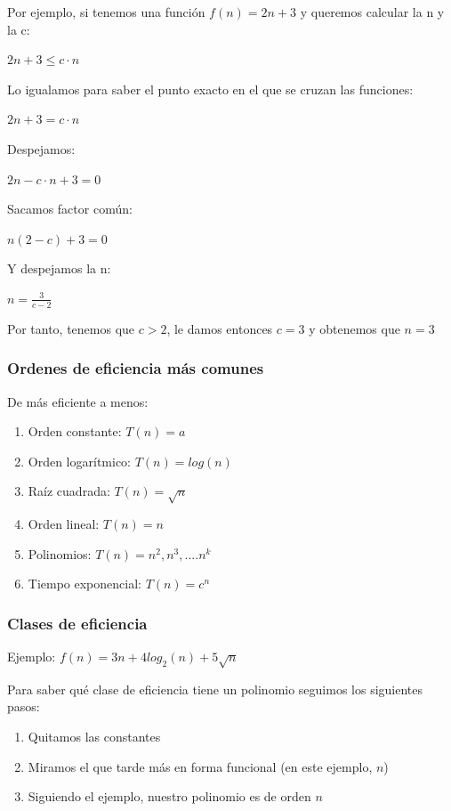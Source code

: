 \documentclass[10pt,a4paper,spanish]{report}
\begin{document}
\noindent
Por ejemplo, si tenemos una función $f(n) = 2n + 3$ y queremos calcular la n y la c:

\begin{center}
$2n + 3 \leq c \cdot n$

Lo igualamos para saber el punto exacto en el que se cruzan las funciones:

$2n + 3 = c \cdot n$

Despejamos:

$2n - c \cdot n + 3 = 0$

Sacamos factor común:

$n(2-c) + 3 = 0$

Y despejamos la n:

$n = \frac{3}{c - 2}$

Por tanto, tenemos que $c > 2$, le damos entonces $c = 3$ y obtenemos que $n = 3$
\end{center}

\subsubsection{\textcolor[rgb]{0.1,0.2,0.6}Ordenes de eficiencia más comunes}
\noindent
De más eficiente a menos:
\begin{enumerate}[---]
\item Orden constante: $T(n) = a$
\item Orden logarítmico: $T(n) = log(n)$
\item Raíz cuadrada: $T(n)=\sqrt{n}$
\item Orden lineal: $T(n)=n$
\item Polinomios: $T(n)=n^{2}, n^{3},.... n^{k}$
\item Tiempo exponencial: $T(n) = c^{n}$
\end{enumerate}

\subsubsection{\textcolor[rgb]{0.1,0.2,0.6}Clases de eficiencia}
\noindent
Ejemplo: $f(n) = 3n + 4log_{2}(n) + 5\sqrt{n}$

\noindent
Para saber qué clase de eficiencia tiene un polinomio seguimos los siguientes pasos:
\begin{enumerate}[1.]
\item Quitamos las constantes
\item Miramos el que tarde más en forma funcional (en este ejemplo, $n$)
\item Siguiendo el ejemplo, nuestro polinomio es de orden $n$
\end{enumerate}
\end{document}
